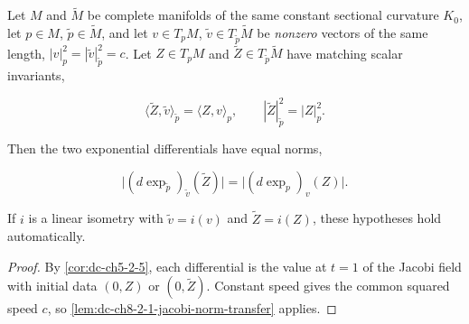 \begin{lemma}
  \label{lem:dc-ch8-2-1-exp-norm-transfer}


  Let $M$ and $\tilde M$ be complete manifolds of the same constant sectional curvature
  $K_0$, let $p\in M$, $\tilde p\in\tilde M$, and let $v\in T_p M$, $\tilde v\in T_{\tilde p}\tilde M$
  be \emph{nonzero} vectors of the same length, $|v|_p^2=|\tilde v|_{\tilde p}^2=c$. Let
  $Z\in T_p M$ and $\tilde Z\in T_{\tilde p}\tilde M$ have matching scalar invariants,

  $$
  \langle \tilde Z,\tilde v\rangle_{\tilde p}=\langle Z,v\rangle_p,
  \qquad |\tilde Z|^2_{\tilde p}=|Z|^2_p .
  $$

  Then the two exponential differentials have equal norms,

  $$
  \big|(d\exp_{\tilde p})_{\tilde v}(\tilde Z)\big| = \big|(d\exp_p)_v(Z)\big| .
  $$

  If $i$ is a linear isometry with $\tilde v=i(v)$ and $\tilde Z=i(Z)$, these
  hypotheses hold automatically.
\end{lemma}
\begin{proof}

\sketch
  By \cref{cor:dc-ch5-2-5}, each differential is the value at $t=1$ of the
  Jacobi field with initial data $(0,Z)$ or $(0,\tilde Z)$. Constant speed gives the
  common squared speed $c$, so \cref{lem:dc-ch8-2-1-jacobi-norm-transfer} applies.
\end{proof}

